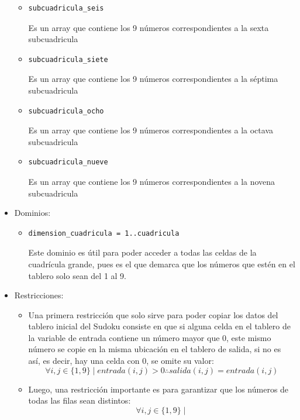 \documentclass[12pt]{article}
\begin{document}
\begin{itemize}
\begin{itemize}
\item \begin{verbatim}
subcuadricula_seis
\end{verbatim} Es un array que contiene los 9 números correspondientes a la sexta subcuadricula
\item \begin{verbatim}
subcuadricula_siete
\end{verbatim} Es un array que contiene los 9 números correspondientes a la séptima subcuadricula
\item \begin{verbatim}
subcuadricula_ocho
\end{verbatim} Es un array que contiene los 9 números correspondientes a la octava subcuadricula
\item \begin{verbatim}
subcuadricula_nueve
\end{verbatim} Es un array que contiene los 9 números correspondientes a la novena subcuadricula
\end{itemize}
\item Dominios:
\begin{itemize}
\item \begin{verbatim}
dimension_cuadricula = 1..cuadricula
\end{verbatim}
Este dominio es útil para poder acceder a todas las celdas de la cuadrícula grande, pues es el que demarca que los números que estén en el tablero solo sean del 1 al 9. 
\end{itemize}
\item Restricciones:
\begin{itemize}
\item Una primera restricción que solo sirve para poder copiar los datos del tablero inicial del Sudoku consiste en que si alguna celda en el tablero de la variable de entrada contiene un número mayor que 0, este mismo número se copie en la misma ubicación en el tablero de salida, si no es así, es decir, hay una celda con 0, se omite su valor:
\begin{equation*}
\forall i,j \in \{1,9\} \mid entrada(i,j) > 0 \therefore salida(i,j) = entrada(i,j)
\end{equation*}
\item Luego, una restricción importante es para garantizar que los números de todas las filas sean distintos:
\begin{equation*}
\forall i,j \in \{1,9\} \mid
\end{equation*}

\end{itemize}
\end{itemize}
\end{document}
